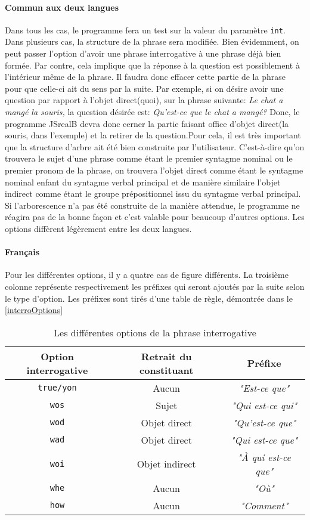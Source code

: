 \documentclass[11pt]{article} %
\newcommand{\system}[1]{\textsf{#1}}
\newcommand{\JSB}{\system{JSrealB}}
\newcommand{\real}[1]{\emph{#1}}
\begin{document}
\paragraph{Commun aux deux langues}

Dans tous les cas, le programme fera un test sur la valeur du paramètre
\texttt{int}. Dans plusieurs cas, la structure de la phrase sera modifiée.
Bien évidemment, on peut passer l'option d'avoir une phrase interrogative
à une phrase déjà bien formée. Par contre, cela implique que la réponse
à la question est possiblement à l'intérieur même de la phrase. Il
faudra donc effacer cette partie de la phrase pour que celle-ci ait
du sens par la suite. Par exemple, si on désire avoir une question
par rapport à l'objet direct(quoi), sur la phrase suivante: \emph{Le
chat a mangé la souris, }la question désirée est: \emph{Qu'est-ce
que le chat a mangé?} Donc, le programme \JSB{} devra donc cerner
la partie faisant office d'objet direct(la souris, dans l'exemple)
et la retirer de la question.Pour cela, il est très important que
la structure d'arbre ait été bien construite par l'utilisateur. C'est-à-dire
qu'on trouvera le sujet d'une phrase comme étant le premier syntagme
nominal ou le premier pronom de la phrase, on trouvera l'objet direct
comme étant le syntagme nominal enfant du syntagme verbal principal
et de manière similaire l'objet indirect comme étant le groupe prépositionnel
issu du syntagme verbal principal. Si l'arborescence n'a pas été construite
de la manière attendue, le programme ne réagira pas de la bonne façon
et c'est valable pour beaucoup d'autres options. Les options diffèrent
légèrement entre les deux langues.

\paragraph{Français}

Pour les différentes options, il y a quatre cas de figure différents.
La troisième colonne représente respectivement les préfixes qui seront
ajoutés par la suite selon le type d'option. Les préfixes sont tirés
d'une table de règle, démontrée dans le \autoref{interroOptions} 
\begin{table}[h]
\centering
\caption{Les différentes options de la phrase interrogative}
\begin{tabular}{|c|c|c|}
\hline 
Option interrogative & Retrait du constituant & Préfixe\\
\hline 
\hline 
\texttt{true/yon} & Aucun & \real{"Est-ce que"}\\
\hline 
\texttt{wos} & Sujet & \real{"Qui est-ce qui"}\\
\hline 
\texttt{wod} & Objet direct & \real{"Qu'est-ce que"}\\
\hline 
\texttt{wad} & Objet direct & \real{"Qui est-ce que"}\\
\hline 
\texttt{woi} & Objet indirect & \real{"À qui est-ce que"}\\
\hline 
\texttt{whe} & Aucun & \real{"Où"}\\
\hline 
\texttt{how} & Aucun & \real{"Comment"}\\
\hline 
\end{tabular}
\label{interroOptions}
\end{table}
\end{document}

